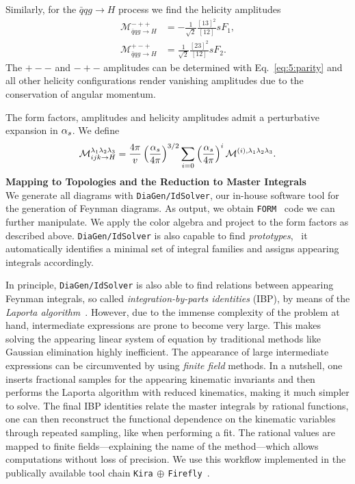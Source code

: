 Similarly, for the $\bar{q}q g \rightarrow H$ process we find the helicity amplitudes
\begin{equation}
\begin{split}
\mathcal{M}^{-++}_{\bar{q}q g \rightarrow H} &= - \frac{1}{\sqrt{2}} \frac{[13]^2}{[12]} s F_1, \\
\mathcal{M}^{+-+}_{\bar{q}q g \rightarrow H} &= \frac{1}{\sqrt{2}} \frac{[23]^2}{[12]} s F_2.
\end{split}
\end{equation}
The $+--$ and $-+-$ amplitudes can be determined with Eq.~\eqref{eq:5:parity} and all other helicity configurations render vanishing amplitudes due to the conservation of angular momentum.

The form factors, amplitudes and helicity amplitudes admit a perturbative expansion in $\alpha_s$. We define
\begin{equation}
\mathcal{M}^{\lambda_1\lambda_2 \lambda_3}_{ijk \rightarrow H} = \frac{4 \pi}{v}  \left(\frac{\alpha_s}{4 \pi}\right)^{3/2} \sum_{i = 0} \left(\frac{\alpha_s}{4 \pi} \right)^i \mathcal{M}^{(i),\lambda_1 \lambda_2 \lambda_3}.
\end{equation}
\textbf{Mapping to Topologies and the Reduction to Master Integrals} \\
We generate all diagrams with \texttt{DiaGen/IdSolver}, our in-house software tool for the generation of Feynman diagrams. As output, we obtain \texttt{FORM}~\cite{Vermaseren:2000nd, Ruijl:2017dtg} code we can further manipulate. We apply the color algebra and project to the form factors as described above. \texttt{DiaGen/IdSolver} is also capable to find \textit{prototypes}, \ie\ it automatically identifies a minimal set of integral families and assigns appearing integrals accordingly.

In principle, \texttt{DiaGen/IdSolver} is also able to find relations between appearing Feynman integrals, so called \textit{integration-by-parts identities} (\acs{IBP}), by means of the \textit{Laporta algorithm}~\cite{Laporta:2000dsw}. However, due to the immense complexity of the problem at hand, intermediate expressions are prone to become very large. This makes solving the appearing linear system of equation by traditional methods like Gaussian elimination highly inefficient. The appearance of large intermediate expressions can be circumvented by using \textit{finite field} methods. In a nutshell, one inserts fractional samples for the appearing kinematic invariants and then performs the Laporta algorithm with reduced kinematics, making it much simpler to solve. The final \acs{IBP} identities relate the master integrals by rational functions, one can then reconstruct the functional dependence on the kinematic variables through repeated sampling, like when performing a fit. The rational values are mapped to finite fields---explaining the name of the method---which allows computations without loss of precision. We use this workflow implemented in the publically available tool chain \texttt{Kira$\,\oplus\,$Firefly}~\cite{Maierhofer:2017gsa, Maierhofer:2018gpa, Klappert:2020nbg}.

